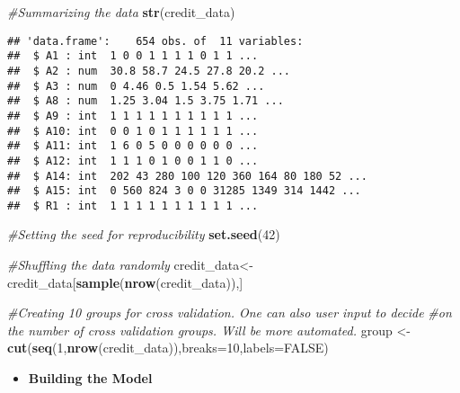 \documentclass[
]{article}
\newenvironment{Shaded}{\begin{snugshade}}{\end{snugshade}}
\newcommand{\CommentTok}[1]{\textcolor[rgb]{0.56,0.35,0.01}{\textit{#1}}}
\newcommand{\DataTypeTok}[1]{\textcolor[rgb]{0.13,0.29,0.53}{#1}}
\newcommand{\DecValTok}[1]{\textcolor[rgb]{0.00,0.00,0.81}{#1}}
\newcommand{\KeywordTok}[1]{\textcolor[rgb]{0.13,0.29,0.53}{\textbf{#1}}}
\newcommand{\NormalTok}[1]{#1}
\newcommand{\OtherTok}[1]{\textcolor[rgb]{0.56,0.35,0.01}{#1}}
\newcommand{\StringTok}[1]{\textcolor[rgb]{0.31,0.60,0.02}{#1}}
\providecommand{\tightlist}{%
  \setlength{\itemsep}{0pt}\setlength{\parskip}{0pt}}
\begin{document}
\begin{Shaded}
\begin{Highlighting}[]
\CommentTok{#Summarizing the data}
\KeywordTok{str}\NormalTok{(credit_data)}
\end{Highlighting}
\end{Shaded}

\begin{verbatim}
## 'data.frame':    654 obs. of  11 variables:
##  $ A1 : int  1 0 0 1 1 1 1 0 1 1 ...
##  $ A2 : num  30.8 58.7 24.5 27.8 20.2 ...
##  $ A3 : num  0 4.46 0.5 1.54 5.62 ...
##  $ A8 : num  1.25 3.04 1.5 3.75 1.71 ...
##  $ A9 : int  1 1 1 1 1 1 1 1 1 1 ...
##  $ A10: int  0 0 1 0 1 1 1 1 1 1 ...
##  $ A11: int  1 6 0 5 0 0 0 0 0 0 ...
##  $ A12: int  1 1 1 0 1 0 0 1 1 0 ...
##  $ A14: int  202 43 280 100 120 360 164 80 180 52 ...
##  $ A15: int  0 560 824 3 0 0 31285 1349 314 1442 ...
##  $ R1 : int  1 1 1 1 1 1 1 1 1 1 ...
\end{verbatim}

\begin{Shaded}
\begin{Highlighting}[]
\CommentTok{#Setting the seed for reproducibility}
\KeywordTok{set.seed}\NormalTok{(}\DecValTok{42}\NormalTok{)}

\CommentTok{#Shuffling the data randomly}
\NormalTok{credit_data<-credit_data[}\KeywordTok{sample}\NormalTok{(}\KeywordTok{nrow}\NormalTok{(credit_data)),]}

\CommentTok{#Creating 10 groups for cross validation. One can also user input to decide }
\CommentTok{#on the number of cross validation groups. Will be more automated.}
\NormalTok{group <-}\StringTok{ }\KeywordTok{cut}\NormalTok{(}\KeywordTok{seq}\NormalTok{(}\DecValTok{1}\NormalTok{,}\KeywordTok{nrow}\NormalTok{(credit_data)),}\DataTypeTok{breaks=}\DecValTok{10}\NormalTok{,}\DataTypeTok{labels=}\OtherTok{FALSE}\NormalTok{)}
\end{Highlighting}
\end{Shaded}

\begin{itemize}
\tightlist
\item
  \textbf{Building the Model}
\end{itemize}
\end{document}
